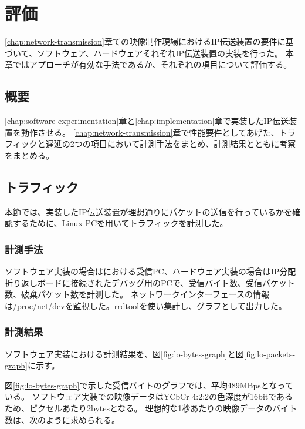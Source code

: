 \chapter{評価}
\label{chap:evaluation}

\ref{chap:network-transmission}章ての映像制作現場におけるIP伝送装置の要件に基づいて、ソフトウェア、ハードウェアそれぞれIP伝送装置の実装を行った。
本章ではアプローチが有効な手法であるか、それぞれの項目について評価する。

\section{概要}

\ref{chap:software-experimentation}章と\ref{chap:implementation}章で実装したIP伝送装置を動作させる。
\ref{chap:network-transmission}章で性能要件としてあげた、トラフィックと遅延の2つの項目において計測手法をまとめ、計測結果とともに考察をまとめる。

\section{トラフィック}

本節では、実装したIP伝送装置が理想通りにパケットの送信を行っているかを確認するために、Linux PCを用いてトラフィックを計測した。

\subsection{計測手法}

ソフトウェア実装の場合はにおける受信PC、ハードウェア実装の場合はIP分配折り返しボードに接続されたデバッグ用のPCで、受信バイト数、受信パケット数、破棄パケット数を計測した。
ネットワークインターフェースの情報は/proc/net/devを監視した。rrdtoolを使い集計し、グラフとして出力した。

\subsection{計測結果}

ソフトウェア実装における計測結果を、図\ref{fig:lo-bytes-graph}と図\ref{fig:lo-packets-graph}に示す。

図\ref{fig:lo-bytes-graph}で示した受信バイトのグラフでは、平均489MBpsとなっている。
ソフトウェア実装での映像データはYCbCr 4:2:2の色深度が16bitであるため、ピクセルあたり2bytesとなる。%
理想的な1秒あたりの映像データのバイト数は、次のように求められる。

